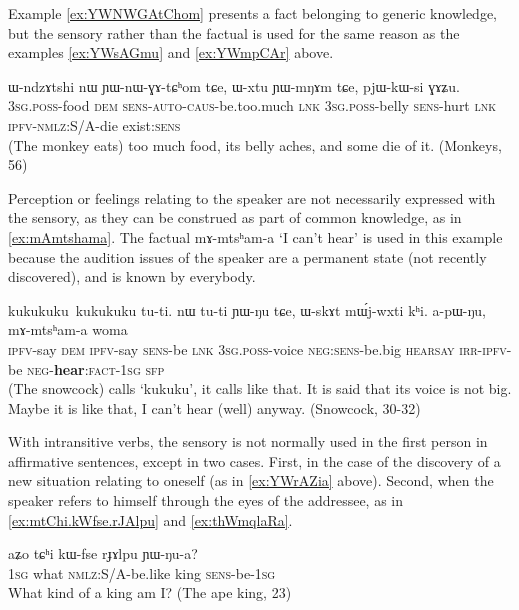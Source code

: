 \documentclass[oldfontcommands,oneside,a4paper,11pt]{article}
\newcommand{\ipa}[1]{{\phon \mbox{#1}}} %
\begin{document}
Example \ref{ex:YWNWGAtChom} presents a fact belonging to generic knowledge, but the sensory rather than the factual is used for the same reason as the examples \ref{ex:YWsAGmu} and \ref{ex:YWmpCAr} above.

\begin{exe}
\ex \label{ex:YWNWGAtChom}
\gll
\ipa{ɯ-ndzɤtshi}  	\ipa{nɯ}  	\ipa{ɲɯ-nɯ-ɣɤ-tɕʰom}  	\ipa{tɕe,}  	\ipa{ɯ-xtu}  	\ipa{ɲɯ-mŋɤm}  	\ipa{tɕe,}  	\ipa{pjɯ-kɯ-si}  	\ipa{ɣɤʑu.}  \\
\textsc{3sg.poss}-food \textsc{dem} \textsc{sens-auto-caus}-be.too.much \textsc{lnk} \textsc{3sg.poss}-belly \textsc{sens}-hurt \textsc{lnk} \textsc{ipfv-nmlz}:S/A-die exist:\textsc{sens} \\
\glt (The monkey eats) too much food, its belly aches, and some die of it. (Monkeys, 56)
\end{exe}
 
 
Perception or feelings relating to the speaker are not necessarily expressed with the sensory, as they can be construed as part of common knowledge, as in \ref{ex:mAmtshama}. The factual  \ipa{mɤ-mtsʰam-a} `I can't hear' is used in this example because the audition issues of the speaker are a permanent state (not recently discovered), and is known by everybody.

\begin{exe}
\ex \label{ex:mAmtshama}
\gll
\ipa{kukukuku kukukuku} 	\ipa{tu-ti.} 	\ipa{nɯ} 	\ipa{tu-ti} 	\ipa{ɲɯ-ŋu} 	\ipa{tɕe,} 	\ipa{ɯ-skɤt} 	\ipa{mɯ́j-wxti} 	\ipa{kʰi.} 	\ipa{a-pɯ-ŋu,} \ipa{mɤ-mtsʰam-a} 	\ipa{woma} \\
{ } \textsc{ipfv}-say \textsc{dem}  \textsc{ipfv}-say \textsc{sens}-be \textsc{lnk}  \textsc{3sg.poss}-voice \textsc{neg:sens}-be.big \textsc{hearsay} \textsc{irr-ipfv}-be \textsc{neg}-\textbf{hear}:\textsc{fact-1sg} \textsc{sfp} \\
\glt (The snowcock) calls `kukuku', it calls like that. It is said that its voice is not big. Maybe it is like that, I can't hear (well) anyway. (Snowcock, 30-32)
\end{exe}

With intransitive verbs, the sensory is not normally used in the first person in affirmative sentences, except in two cases. First, in the case of the discovery of a new situation relating to oneself (as in \ref{ex:YWrAZia} above). Second, when the speaker refers to himself through the eyes of the addressee, as in \ref{ex:mtChi.kWfse.rJAlpu} and \ref{ex:thWmqlaRa}.


\begin{exe}
\ex \label{ex:mtChi.kWfse.rJAlpu}
\gll
\ipa{aʑo}  	\ipa{tɕʰi}  	\ipa{kɯ-fse}  	\ipa{rɟɤlpu}  	\ipa{ɲɯ-ŋu-a?}  \\
\textsc{1sg} what \textsc{nmlz}:S/A-be.like king \textsc{sens}-be-\textsc{1sg} \\
\glt What kind of a king am I? (The ape  king, 23)
\end{exe}
\end{document}
